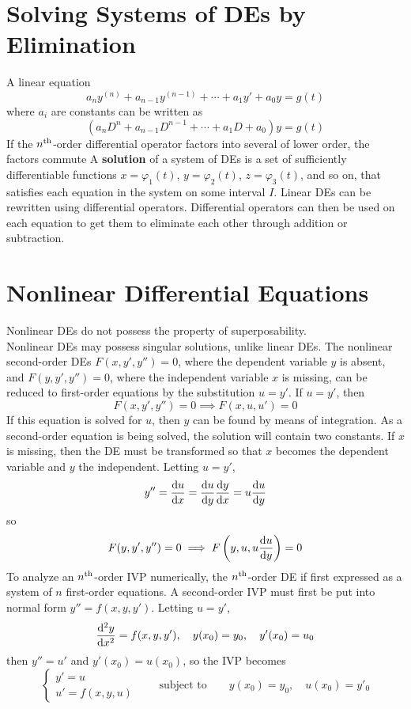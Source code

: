 \documentclass[./Differential Equations]{subfiles}
\begin{document}
	\section{Solving Systems of DEs by Elimination}
			A linear equation
				\[a_ny^{(n)} + a_{n - 1}y^{(n - 1)} + \cdots + a_1y' + a_0y = g(t)\]
				where \(a_i\) are constants can be written as
				\[\left(a_nD^n + a_{n - 1}D^{n - 1} + \cdots + a_1D + a_0\right)y = g(t)\]
				If the \(n^{\text{th}}\)-order differential operator factors into several of lower order, the factors commute
			A \textbf{solution} of a system of DEs is a set of sufficiently differentiable functions \(x = \varphi_1(t)\), \(y = \varphi_2(t)\), \(z = \varphi_3(t)\), and so on, that satisfies each equation in the system on some interval \(I\).
			Linear DEs can be rewritten using differential operators. Differential operators can then be used on each equation to get them to eliminate each other through addition or subtraction.
	\section{Nonlinear Differential Equations}
			Nonlinear DEs do not possess the property of superposability. \\
			Nonlinear DEs may possess singular solutions, unlike linear DEs.
			The nonlinear second-order DEs \(F(x, y', y'') = 0\), where the dependent variable \(y\) is absent,  and \(F(y, y', y'') = 0\), where the independent variable \(x\) is missing, can be reduced to first-order equations by the substitution \(u = y'\).
			If \(u = y'\), then
				\[F(x, y', y'') = 0 \implies F(x, u, u') = 0\]
				If this equation is solved for \(u\), then \(y\) can be found by means of integration. As a second-order equation is being solved, the solution will contain two constants.
			If \(x\) is missing, then the DE must be transformed so that \(x\) becomes the dependent variable and \(y\) the independent. Letting \(u = y'\),
				\[y'' = \dv{u}{x} = \dv{u}{y}\dv{y}{x} = u\dv{u}{y}\]
				so
				\[F(y, y', y'') = 0 \implies F\left(y, u, u\dv{u}{y}\right) = 0\]
			To analyze an \(n^{\text{th}}\)-order IVP numerically, the \(n^{\text{th}}\)-order DE if first expressed as a system of \(n\) first-order equations. A second-order IVP must first be put into normal form \(y'' = f(x, y, y')\). Letting \(u = y'\), 
				\[
					\dv[2]{y}{x} = f(x, y, y'),\quad 
					y(x_0) = y_0,\quad
					y'(x_0) = u_0
				\]
				then \(y'' = u'\) and \(y'(x_0) = u(x_0)\), so the IVP becomes
				\[
					\begin{cases}
						y' = u	\\
						u' = f(x, y, u) 
					\end{cases} \qquad \text{subject to} \qquad
					y(x_0) = y_0,\quad u(x_0) = y'_0
				\]
\end{document}
